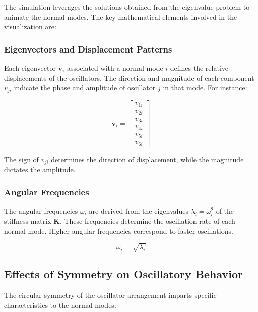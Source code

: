 \documentclass[12pt]{report} %
\begin{document}
The simulation leverages the solutions obtained from the eigenvalue problem to animate the normal modes. The key mathematical elements involved in the visualization are:

\subsubsection{Eigenvectors and Displacement Patterns}
\label{subsubsec:part2_task3_eigenvectors}

Each eigenvector \( \mathbf{v}_i \) associated with a normal mode \( i \) defines the relative displacements of the oscillators. The direction and magnitude of each component \( v_{ji} \) indicate the phase and amplitude of oscillator \( j \) in that mode. For instance:

\[
\mathbf{v}_i = \begin{bmatrix}
v_{1i} \\
v_{2i} \\
v_{3i} \\
v_{4i} \\
v_{5i} \\
v_{6i}
\end{bmatrix}
\]

The sign of \( v_{ji} \) determines the direction of displacement, while the magnitude dictates the amplitude.

\subsubsection{Angular Frequencies}
\label{subsubsec:part2_task3_angular_frequencies}

The angular frequencies \( \omega_i \) are derived from the eigenvalues \( \lambda_i = \omega_i^2 \) of the stiffness matrix \( \mathbf{K} \). These frequencies determine the oscillation rate of each normal mode. Higher angular frequencies correspond to faster oscillations.

\[
\omega_i = \sqrt{\lambda_i}
\]

\subsection{Effects of Symmetry on Oscillatory Behavior}
\label{subsec:part2_task3_symmetry_effects}

The circular symmetry of the oscillator arrangement imparts specific characteristics to the normal modes:
\end{document}
